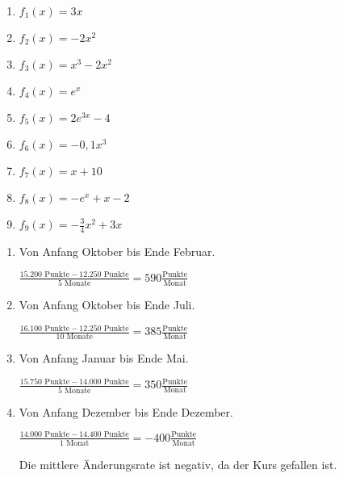 \begin{Exercise}[title={Bestimme jeweils die durchschnittliche Änderungsrate auf den Intervallen \(I_1=[0,\ 2]\) sowie \(I_2=[-2,\ 2]\) und \(I_3=[-1,\ 4]\). Du kannst auf 2 Nachkommastellen runden, falls notwendig.}, label=aenderungsrateA2]

    \begin{minipage}{\textwidth}
		\begin{enumerate}[label=\alph*)]
			\item \(f_1(x)=3x\)
			\item \(f_2(x)=-2x^2\)
			\item \(f_3(x)=x^3-2x^2\)
			\item \(f_4(x)=e^x\)
			\item \(f_5(x)=2e^{3x}-4\)
			\item \(f_6(x)=-0,1x^3\)
			\item \(f_7(x)=x+10\)
			\item \(f_8(x)=-e^x+x-2\)
			\item \(f_9(x)=-\frac{3}{4}x^2+3x\)
		\end{enumerate}
    \end{minipage}
\end{Exercise}
\begin{Answer}[ref=aenderungsrateA1]
	\begin{enumerate}[label=\alph*)]
		\item Von Anfang Oktober bis Ende Februar.

		\(\frac{15.200\text{ Punkte}-12.250\text{ Punkte}}{5\text{ Monate}}= 590\frac{\text{Punkte}}{\text{Monat}}\)
		\item Von Anfang Oktober bis Ende Juli.

		\(\frac{16.100\text{ Punkte}-12.250\text{ Punkte}}{10\text{ Monate}}= 385\frac{\text{Punkte}}{\text{Monat}}\)
		\item Von Anfang Januar bis Ende Mai.

		\(\frac{15.750\text{ Punkte}-14.000\text{ Punkte}}{5\text{ Monate}}= 350\frac{\text{Punkte}}{\text{Monat}}\)
		\item Von Anfang Dezember bis Ende Dezember.

		\(\frac{14.000\text{ Punkte}-14.400\text{ Punkte}}{1\text{ Monat}}=-400\frac{\text{Punkte}}{\text{Monat}}\)

		Die mittlere Änderungsrate ist negativ, da der Kurs gefallen ist.
	\end{enumerate}
\end{Answer}
